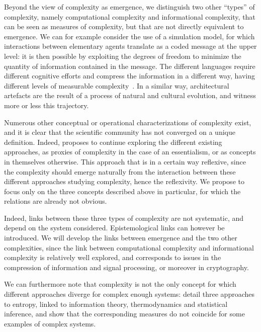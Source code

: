 

Beyond the view of complexity as emergence, we distinguish two other ``types'' of complexity, namely computational complexity and informational complexity, that can be seen as measures of complexity, but that are not directly equivalent to emergence. We can for example consider the use of a simulation model, for which interactions between elementary agents translate as a coded message at the upper level: it is then possible by exploiting the degrees of freedom to minimize the quantity of information contained in the message. The different languages require different cognitive efforts and compress the information in a different way, having different levels of measurable complexity~\cite{febres2013complexity}. In a similar way, architectural artefacts are the result of a process of natural and cultural evolution, and witness more or less this trajectory.


Numerous other conceptual or operational characterizations of complexity exist, and it is clear that the scientific community has not converged on a unique definition. Indeed, \cite{chu2008criteria} proposes to continue exploring the different existing approaches, as proxies of complexity in the case of an essentialism, or as concepts in themselves otherwise. This approach that is in a certain way reflexive, since the complexity should emerge naturally from the interaction between these different approaches studying complexity, hence the reflexivity. We propose to focus only on the three concepts described above in particular, for which the relations are already not obvious.



Indeed, links between these three types of complexity are not systematic, and depend on the system considered. Epistemological links can however be introduced. We will develop the links between emergence and the two other complexities, since the link between computational complexity and informational complexity is relatively well explored, and corresponds to issues in the compression of information and signal processing, or moreover in cryptography.


We can furthermore note that complexity is not the only concept for which different approaches diverge for complex enough systems: \cite{thurner2017three} detail three approaches to entropy, linked to information theory, thermodynamics and statistical inference, and show that the corresponding measures do not coincide for some examples of complex systems.



